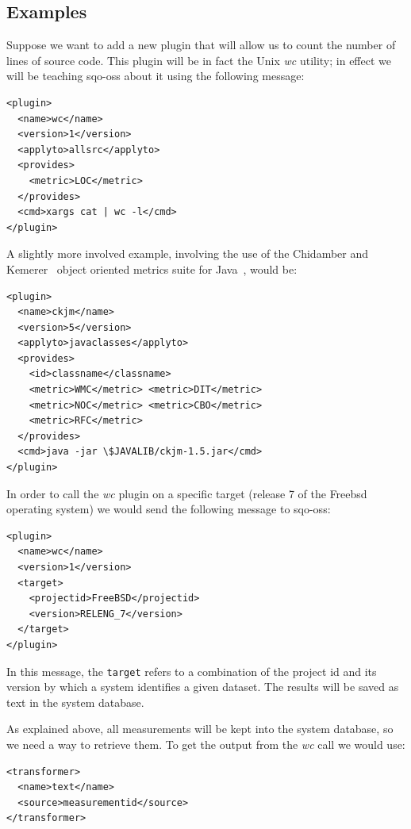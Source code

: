 \documentclass{llncs}
\begin{document}
\subsection{Examples}
\label{subsec:example}

Suppose we want to add a new plugin that will allow us to count the
number of lines of source code. This plugin will be in fact the
Unix {\em wc} utility; in effect we will be teaching {\sc sqo-oss} about
it using the following message:

\begin{verbatim}
<plugin>
  <name>wc</name>
  <version>1</version>
  <applyto>allsrc</applyto>
  <provides>
    <metric>LOC</metric>
  </provides>
  <cmd>xargs cat | wc -l</cmd>
</plugin>
\end{verbatim}

A slightly more involved example, involving the use of the Chidamber
and Kemerer~\cite{CHKE94} object oriented metrics suite for
Java~\cite{SPINELLIS05}, would be:

\begin{verbatim}
<plugin>
  <name>ckjm</name>
  <version>5</version>
  <applyto>javaclasses</applyto>
  <provides>
  	<id>classname</classname>
  	<metric>WMC</metric> <metric>DIT</metric>
  	<metric>NOC</metric> <metric>CBO</metric>
  	<metric>RFC</metric>
  </provides>
  <cmd>java -jar \$JAVALIB/ckjm-1.5.jar</cmd>
</plugin>
\end{verbatim}

In order to call the {\em wc} plugin on a specific target (release 7
of the Free{\sc bsd} operating system) we would send the
following message to {\sc sqo-oss}:

\begin{verbatim}
<plugin>
  <name>wc</name>
  <version>1</version>
  <target>
    <projectid>FreeBSD</projectid>
    <version>RELENG_7</version>
  </target>
</plugin>
\end{verbatim}

In this message, the \texttt{target} refers to a combination of the
project {\sc id} and its version by which a system identifies a given
dataset. The results will be saved as text in the system database.

As explained above, all measurements will be kept into the system
database, so we need a way to retrieve them. To get the output from
the {\em wc} call we would use:

\begin{verbatim}
<transformer>
  <name>text</name>
  <source>measurementid</source>
</transformer>
\end{verbatim}
\end{document}
